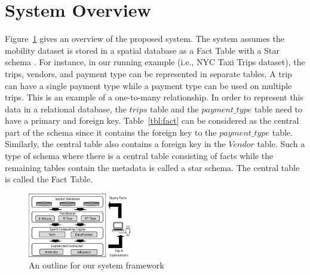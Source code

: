 \section{System Overview}
Figure~\ref{fig:framework} gives an overview of the proposed system. 
The system assumes the mobility dataset is stored in a spatial database as a Fact Table with a Star schema \cite{giovinazzo2000object,adamson2010star}. 
For instance, in our running example (i.e., NYC Taxi Trips dataset), the trips, vendors, and payment type can be represented in separate tables. A trip can have a single payment type while a payment type can be used on multiple trips. This is an example of a one-to-many relationship. 
In order to represent this data in a relational database, the $trips$ table and the $payment\_type$ table need to have a primary and foreign key. Table~\ref{tbl:fact} can be considered as the central part of the schema since it contains the foreign key to the $payment\_type$ table. Similarly, the central table also contains a foreign key in the $Vendor$ table. Such a type of schema where there is a central table consisting of facts while the remaining tables contain the metadata is called a star schema. The central table is called the Fact Table. 


\begin{figure}[t]
	\centering
	\includegraphics[width=0.4\textwidth]{images/architecture.eps}
	\caption{An outline for our system framework}
	\label{fig:framework}
\end{figure}




